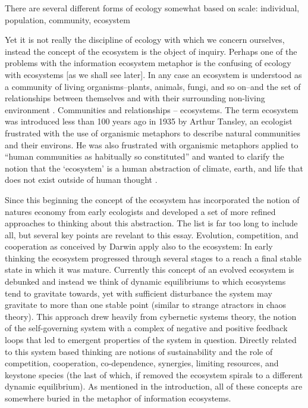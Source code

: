 There are several different forms of ecology somewhat based on scale: individual, population, community, ecosystem 

Yet it is not really the discipline of ecology with which we concern ourselves, instead the concept of the ecosystem is the object of inquiry. Perhaps one of the problems with the information ecosystem metaphor is the confusing of ecology with ecosystems [as we shall see later]. In any case an ecosystem is understood as a community of living organisms–plants, animals, fungi, and so on–and the set of relationships between themselves and with their surrounding non-living environment \cite{tansley_1935, odum_1953}. Communities and relationships – ecosystems. The term ecosystem was introduced less than 100 years ago in 1935 by Arthur Tansley, an ecologist frustrated with the use of organismic metaphors to describe natural communities and their environs. He was also frustrated with organismic metaphors applied to “human communities as habitually so constituted” and wanted to clarify the notion that the ‘ecosystem’ is a human abstraction of climate, earth, and life that does not exist outside of human thought \cite{tansley_1935}.

Since this beginning the concept of the ecosystem has incorporated the notion of natures economy from early ecologists and developed a set of more refined approaches to thinking about this abstraction. The list is far too long to include all, but several key points are revelant to this essay. Evolution, competition, and cooperation as conceived by Darwin apply also to the ecosystem: In early thinking the ecosystem progressed through several stages to a reach a final stable state in which it was mature. Currently this concept of an evolved ecosystem is debunked and instead we think of dynamic equilibriums to which ecosystems tend to gravitate towards, yet with sufficient disturbance the system may gravitate to more than one stable point (similar to strange atractors in chaos theory). This approach drew heavily from cybernetic systems theory, the notion of the self-governing system with a complex of negative and positive feedback loops that led to emergent properties of the system in question. Directly related to this system based thinking are notions of sustainability and the role of competition, cooperation, co-dependence, synergies, limiting resources, and keystone species (the last of which, if removed the ecosystem spirals to a different dynamic equilibrium). As mentioned in the introduction, all of these concepts are somewhere buried in the metaphor of information ecosystems.

